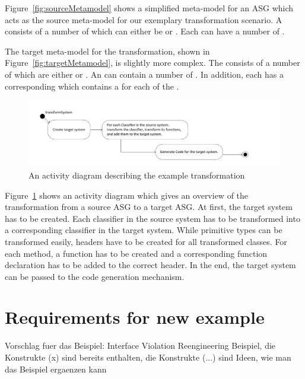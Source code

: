 Figure~\ref{fig:sourceMetamodel} shows a simplified meta-model for an ASG which acts as the source meta-model for our exemplary transformation scenario. A  consists of a number of  which can either be  or . Each  can have a number of .

The target meta-model for the transformation, shown in Figure~\ref{fig:targetMetamodel}, is slightly more complex.
The  consists of a number of  which are either  or .
An  can contain a number of . In addition, each  has a corresponding  which contains a  for each  of the .


\begin{figure}[htbp]
\begin{center}
  \includegraphics[width=\textwidth]{figures/transformationOverview}
  \caption{An activity diagram describing the example transformation}
  \label{fig:transformationOverview}
\end{center}
\end{figure}

Figure~\ref{fig:transformationOverview} shows an activity diagram which gives an overview of the transformation from a source ASG to a target ASG.
At first, the target system has to be created. Each classifier in the source system has to be transformed into a corresponding classifier in the target system. While primitive types can be transformed easily, headers have to be created for all transformed classes. For each method, a function has to be created and a corresponding function declaration has to be added to the correct header. In the end, the target system can be passed to the code generation mechanism.

\section{Requirements for new example}

Vorschlag fuer das Beispiel: Interface Violation Reengineering Beispiel, die Konstrukte (x) sind bereits enthalten, die Konstrukte (...) sind Ideen, wie man das Beispiel ergaenzen kann


